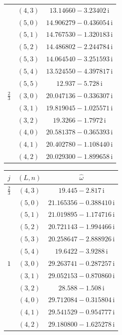 \begin{table}[H]
\begin{minipage}[t]{0.325\textwidth}
\begin{tabular}[t]{|c|c|c|}
 & $(4,3)$ & $13.14660-3.23402\,\mathrm{i}$ \\
 & $(5,0)$ & $14.906279-0.436054\,\mathrm{i}$ \\
 & $(5,1)$ & $14.767530-1.320183\,\mathrm{i}$ \\
 & $(5,2)$ & $14.486802-2.244784\,\mathrm{i}$ \\
 & $(5,3)$ & $14.064540-3.251593\,\mathrm{i}$ \\
 & $(5,4)$ & $13.524550-4.397817\,\mathrm{i}$ \\
 & $(5,5)$ & $12.937-5.728\,\mathrm{i}$ \\
\hline
$\tfrac23$ & $(3,0)$ & $20.047136-0.336307\,\mathrm{i}$ \\
 & $(3,1)$ & $19.819045-1.025571\,\mathrm{i}$ \\
 & $(3,2)$ & $19.3266-1.7972\,\mathrm{i}$ \\
 & $(4,0)$ & $20.581378-0.365393\,\mathrm{i}$ \\
 & $(4,1)$ & $20.402780-1.108440\,\mathrm{i}$ \\
 & $(4,2)$ & $20.029300-1.899658\,\mathrm{i}$ \\
\hline
\end{tabular}
\end{minipage}\hfill
\begin{minipage}[t]{0.325\textwidth}
\centering
\begin{tabular}[t]{|c|c|c|}
\hline
$j$ & $(L,n)$ & $\widehat{\omega}$ \\
\hline
$\tfrac23$ & $(4,3)$ & $19.445-2.817\,\mathrm{i}$ \\
 & $(5,0)$ & $21.165356-0.388410\,\mathrm{i}$ \\
 & $(5,1)$ & $21.019895-1.174716\,\mathrm{i}$ \\
 & $(5,2)$ & $20.721143-1.994466\,\mathrm{i}$ \\
 & $(5,3)$ & $20.258647-2.888926\,\mathrm{i}$ \\
 & $(5,4)$ & $19.6422-3.9288\,\mathrm{i}$ \\
\hline
$1$ & $(3,0)$ & $29.263741-0.287257\,\mathrm{i}$ \\
 & $(3,1)$ & $29.052153-0.870860\,\mathrm{i}$ \\
 & $(3,2)$ & $28.588-1.508\,\mathrm{i}$ \\
 & $(4,0)$ & $29.712084-0.315804\,\mathrm{i}$ \\
 & $(4,1)$ & $29.541529-0.954777\,\mathrm{i}$ \\
 & $(4,2)$ & $29.180800-1.625278\,\mathrm{i}$ \\

\end{tabular}
\end{minipage}
\end{table}
